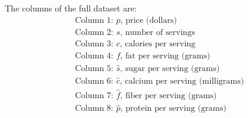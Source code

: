 The columns of the full dataset are:
\begin{align*}
& \text{Column 1: $p$, price (dollars)} \\
& \text{Column 2: $s$, number of servings} \\
& \text{Column 3: $c$, calories per serving} \\
& \text{Column 4: $f$, fat per serving (grams)} \\
& \text{Column 5: $\hat{s}$, sugar per serving (grams)} \\
& \text{Column 6: $\hat{c}$, calcium per serving (milligrams)} \\
& \text{Column 7: $\hat{f}$, fiber per serving (grams)} \\
& \text{Column 8: $\hat{p}$, protein per serving (grams)}
\end{align*}


